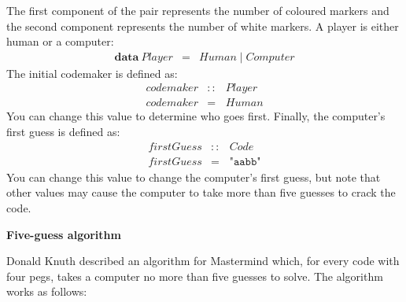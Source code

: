 \documentclass{../cs256-shared/cs256}
\begin{document}
The first component of the pair represents the number of coloured markers and the second component represents the number of white markers. A player is either human or a computer:
\begin{displaymath}
\begin{array}{lcl}
\mathbf{data}~\mathit{Player} & = & \mathit{Human} \mid \mathit{Computer}
\end{array}
\end{displaymath}
The initial codemaker is defined as:
\begin{displaymath}
\begin{array}{lcl}
\mathit{codemaker} & :: & \mathit{Player} \\
\mathit{codemaker} & = & \mathit{Human}
\end{array}
\end{displaymath}
You can change this value to determine who goes first. Finally, the computer's first guess is defined as:
\begin{displaymath}
\begin{array}{lcl}
\mathit{firstGuess} & :: & \mathit{Code} \\
\mathit{firstGuess} & = & \texttt{"aabb"}
\end{array}
\end{displaymath}
You can change this value to change the computer's first guess, but note that other values may cause the computer to take more than five guesses to crack the code.

\textbf{Five-guess algorithm}

Donald Knuth described an algorithm for Mastermind which, for every code with four pegs, takes a computer no more than five guesses to solve. The algorithm works as follows:
\end{document}
